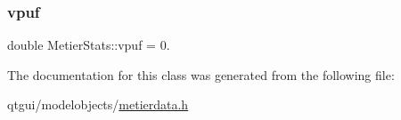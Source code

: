 \mbox{\label{class_metier_stats_a19114fb82a0d58217cd2a8bd0d7d2b4b}} 
\subsubsection{\texorpdfstring{vpuf}{vpuf}}
{\footnotesize\ttfamily double Metier\+Stats\+::vpuf = 0.}



The documentation for this class was generated from the following file\+:\begin{DoxyCompactItemize}
\item 
qtgui/modelobjects/\mbox{\hyperlink{metierdata_8h}{metierdata.\+h}}\end{DoxyCompactItemize}
